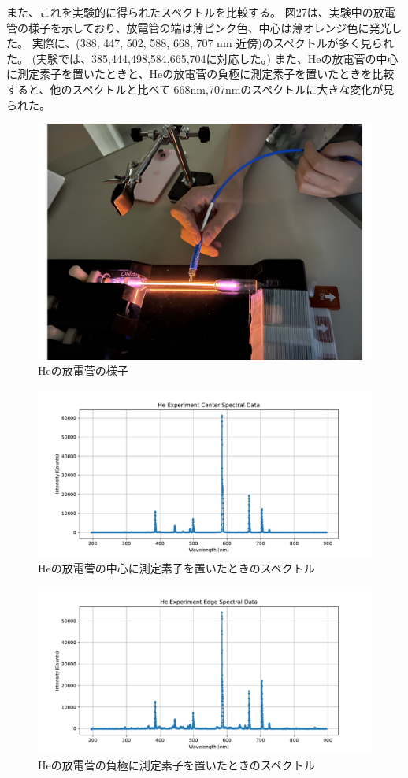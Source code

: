 \documentclass[a4j,twocolumn]{jsarticle}
\begin{document}
また、これを実験的に得られたスペクトルを比較する。
図27は、実験中の放電管の様子を示しており、放電管の端は薄ピンク色、中心は薄オレンジ色に発光した。
実際に、(388, 447, 502, 588, 668, 707 nm 近傍)のスペクトルが多く見られた。
(実験では、385,444,498,584,665,704に対応した。)
また、Heの放電菅の中心に測定素子を置いたときと、Heの放電菅の負極に測定素子を置いたときを比較すると、他のスペクトルと比べて
668nm,707nmのスペクトルに大きな変化が見られた。


\begin{figure}[htb]
    \centering
    \includegraphics[keepaspectratio,width=0.6\columnwidth]{fig/latexmkrc.pdf}
    \caption{Heの放電菅の様子}
\end{figure}
\begin{figure}[htb]
    \centering
    \includegraphics[keepaspectratio,width=0.6\columnwidth]{fig/He_center.pdf}
    \caption{Heの放電菅の中心に測定素子を置いたときのスペクトル}
\end{figure}
\begin{figure}[htb]
    \centering
    \includegraphics[keepaspectratio,width=0.6\columnwidth]{fig/He_edge.pdf}
    \caption{Heの放電菅の負極に測定素子を置いたときのスペクトル}
\end{figure}
\end{document}
